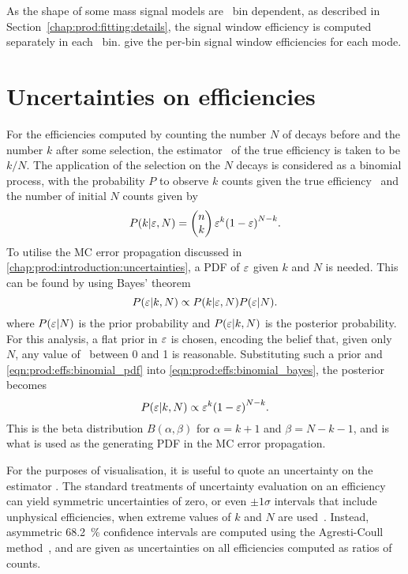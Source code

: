 As the shape of some mass signal models are \pTy\ bin dependent, as described 
in Section~\ref{chap:prod:fitting:details}, the signal window efficiency is computed 
separately in each \pTy\ bin.
give the per-bin signal window efficiencies for each mode.

\section{Uncertainties on efficiencies}
\label{chap:prod:effs:tot}

For the efficiencies computed by counting the number $N$ of decays before and 
the number $k$ after some selection, the estimator \effest\ of the true 
efficiency is taken to be $k/N$.
The application of the selection on the $N$ decays is considered as a binomial 
process, with the probability $P$ to observe $k$ counts given the true 
efficiency \eff\ and the number of initial $N$ counts given by
\begin{equation}
  P(k | \varepsilon, N) = \begin{pmatrix}n\\k\end{pmatrix}\varepsilon^{k}{(1 - \varepsilon)}^{N - k}.
  \label{eqn:prod:effs:binomial_pdf}
\end{equation}
To utilise the \ac{MC} error propagation discussed in 
\cref{chap:prod:introduction:uncertainties}, a \ac{PDF} of $\varepsilon$ given $k$ and 
$N$ is needed.
This can be found by using Bayes' theorem
\begin{equation}
  P(\varepsilon | k, N) \propto P(k | \varepsilon, N)P(\varepsilon |N).
  \label{eqn:prod:effs:binomial_bayes}
\end{equation}
where $P(\varepsilon | N)$ is the prior probability and $P(\varepsilon | k, N)$ is the 
posterior probability.
For this analysis, a flat prior in $\varepsilon$ is chosen, encoding the belief that, 
given only $N$, any value of \eff\ between 0 and 1 is reasonable.
Substituting such a prior and \cref{eqn:prod:effs:binomial_pdf} into 
\cref{eqn:prod:effs:binomial_bayes}, the posterior becomes
\begin{equation}
  P(\varepsilon | k, N) \propto \varepsilon^{k}{(1 - \varepsilon)}^{N - k}.
\end{equation}
This is the beta distribution $B(\alpha, \beta)$ for $\alpha = k + 1$ and 
$\beta = N - k - 1$, and is what is used as the generating \ac{PDF} in the 
\ac{MC} error propagation.

For the purposes of visualisation, it is useful to quote an uncertainty on the 
estimator \effest.
The standard treatments of uncertainty evaluation on an efficiency can yield 
symmetric uncertainties of zero, or even $\pm1\sigma$ intervals that include 
unphysical efficiencies, when extreme values of $k$ and $N$ are 
used~\cite{Paterno:2004cb}.
Instead, asymmetric \SI{68.2}{\percent} confidence intervals are computed using 
the Agresti-Coull method~\cite{Agresti:2685469}, and are given as uncertainties 
on all efficiencies computed as ratios of counts.

